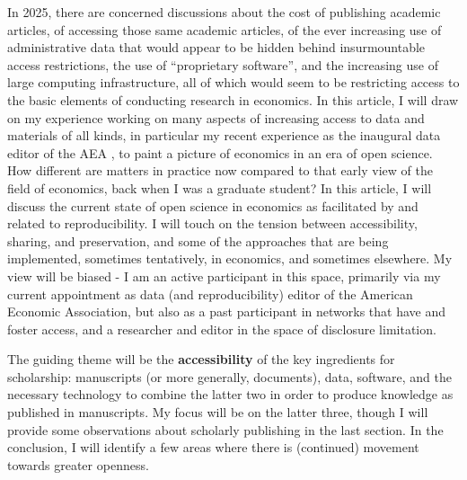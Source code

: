 \documentclass{article}
\begin{document}
In 2025, there are concerned discussions about the cost of publishing academic articles, of accessing those same academic articles, of the ever increasing use of administrative data \citep{card_expanding_2010,card_expanding_2010-1,chetty_time_2012,einav_economics_2014} that would appear to be hidden behind insurmountable access restrictions,  the use of ``proprietary software'', and the increasing use of large computing infrastructure, all of which would seem to be restricting access to the basic elements of conducting research in economics. In this article, I will draw on my experience working on many aspects of increasing access to data and materials of all kinds, in particular my recent experience as the inaugural data editor of the \ac{AEA} \citep{10.1257/pandp.108.745}, to paint a picture of economics in an era of open science. How different are matters in practice now compared to that early view of the field of economics, back when I was a graduate student?
%
In this article, I will discuss the current state of open science in economics as facilitated by and related to reproducibility. I will touch on the tension between accessibility, sharing, and preservation, and some of the approaches that are being implemented, sometimes tentatively, in economics, and sometimes elsewhere. My view will be biased - I am an active participant in this space, primarily via my current appointment as data (and reproducibility) editor of the American Economic Association, but also as a past participant in networks that have and foster access, and a researcher and editor in the space of disclosure limitation.

The guiding theme will be the \textbf{accessibility} of the key ingredients for scholarship: manuscripts (or more generally, documents), data, software, and the necessary technology to combine the latter two in order to produce knowledge as published in manuscripts. My focus will be on the latter three, though I will provide some observations about scholarly publishing in the last section.
In the conclusion, I will identify a few areas where there is (continued) movement towards greater openness. 


\end{document}
